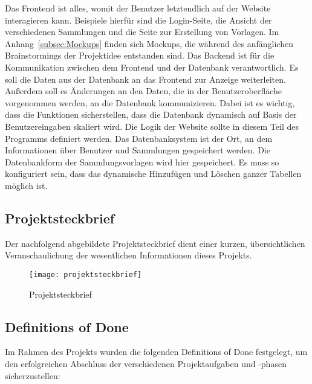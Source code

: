 Das Frontend ist alles, womit der Benutzer letztendlich auf der Website interagieren kann.
Beispiele hierfür sind die Login-Seite, die Ansicht der verschiedenen Sammlungen und die Seite zur Erstellung von Vorlagen.
Im Anhang~\ref{subsec:Mockups} finden sich Mockups, die während des anfänglichen Brainstormings der Projektidee entstanden sind.
Das Backend ist für die Kommunikation zwischen dem Frontend und der Datenbank verantwortlich.
Es soll die Daten aus der Datenbank an das Frontend zur Anzeige weiterleiten.
Außerdem soll es Änderungen an den Daten, die in der Benutzeroberfläche vorgenommen werden, an die Datenbank kommunizieren.
Dabei ist es wichtig, dass die Funktionen sicherstellen, dass die Datenbank dynamisch auf Basis der Benutzereingaben skaliert wird.
Die Logik der Website sollte in diesem Teil des Programms definiert werden.
Das Datenbanksystem ist der Ort, an dem Informationen über Benutzer und Sammlungen gespeichert werden.
Die Datenbankform der Sammlungsvorlagen wird hier gespeichert.
Es muss so konfiguriert sein, dass das dynamische Hinzufügen und Löschen ganzer Tabellen möglich ist.

\subsection{Projektsteckbrief}\label{subsec:projektsteckbrief}
Der nachfolgend abgebildete Projektsteckbrief dient einer kurzen, übersichtlichen Veranschaulichung der wesentlichen Informationen dieses Projekts.

\begin{figure}[H]
    \centering
    \texttt{[image: projektsteckbrief]}
    \caption{Projektsteckbrief}\label{fig:projektsteckbrief}
\end{figure}

\newpage
\subsection{Definitions of Done}\label{subsec:definitions-of-done}



Im Rahmen des Projekts wurden die folgenden Definitions of Done festgelegt, um den erfolgreichen Abschluss der verschiedenen Projektaufgaben und -phasen sicherzustellen:

